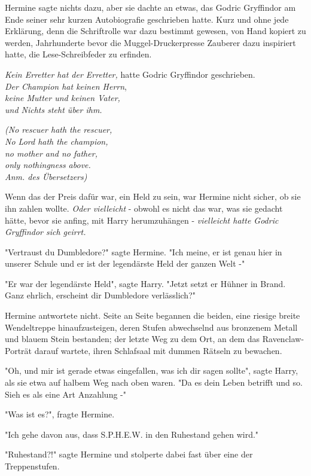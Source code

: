 {Hermine sagte nichts dazu, aber sie dachte an etwas, das Godric Gryffindor am Ende seiner sehr kurzen Autobiografie geschrieben hatte. Kurz und ohne jede Erklärung, denn die Schriftrolle war dazu bestimmt gewesen, von Hand kopiert zu werden, Jahrhunderte bevor die Muggel-Druckerpresse Zauberer dazu inspiriert hatte, die Lese-Schreibfeder zu erfinden.

\emph{Kein Erretter hat der Erretter,} hatte Godric Gryffindor geschrieben.\\ \emph{Der Champion hat keinen Herrn},\\ \emph{keine Mutter und keinen Vater,}\\ \emph{und Nichts steht über ihm.}

\emph{(No rescuer hath the rescuer,}\\ \emph{No Lord hath the champion,}\\ \emph{no mother and no father,\\ only nothingness above.}\\ \emph{Anm. des Übersetzers)}

Wenn das der Preis dafür war, ein Held zu sein, war Hermine nicht sicher, ob sie ihn zahlen wollte. \emph{Oder vielleicht} - obwohl es nicht das war, was sie gedacht hätte, bevor sie anfing, mit Harry herumzuhängen - \emph{vielleicht hatte Godric Gryffindor sich geirrt.}

"Vertraust du Dumbledore?" sagte Hermine. "Ich meine, er ist genau hier in unserer Schule und er ist der legendärste Held der ganzen Welt -"

"Er war der legendärste Held", sagte Harry. "Jetzt setzt er Hühner in Brand. Ganz ehrlich, erscheint dir Dumbledore verlässlich?"

Hermine antwortete nicht. Seite an Seite begannen die beiden, eine riesige breite Wendeltreppe hinaufzusteigen, deren Stufen abwechselnd aus bronzenem Metall und blauem Stein bestanden; der letzte Weg zu dem Ort, an dem das Ravenclaw-Porträt darauf wartete, ihren Schlafsaal mit dummen Rätseln zu bewachen.

"Oh, und mir ist gerade etwas eingefallen, was ich dir sagen sollte", sagte Harry, als sie etwa auf halbem Weg nach oben waren. "Da es dein Leben betrifft und so. Sieh es als eine Art Anzahlung -"

"Was ist es?", fragte Hermine.

"Ich gehe davon aus, dass S.P.H.E.W. in den Ruhestand gehen wird."

"Ruhestand?!" sagte Hermine und stolperte dabei fast über eine der Treppenstufen.

}
